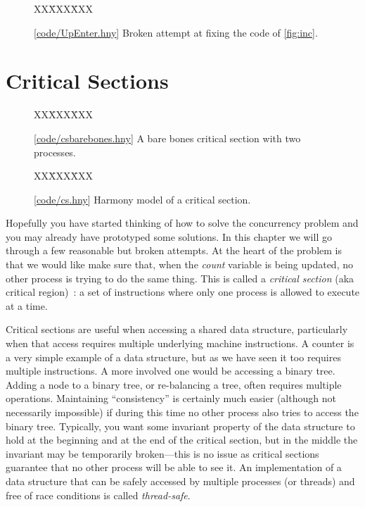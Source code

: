 \documentclass{report}
\newcommand{\harmonysource}[1]{
\begin{tabbing}
XX\=XXX\=XXX\kill
    
\end{tabbing}
}
\newcommand{\harmonylink}[1]{%
[\href{https://www.cs.cornell.edu/home/rvr/harmony/#1}{\underline{#1}}]%
}
\newenvironment{code}{
\tcolorbox
}{
\endtcolorbox
}
\begin{document}
\begin{figure}
\begin{code}
\harmonysource{UpEnter}
\end{code}
\caption{\harmonylink{code/UpEnter.hny} Broken attempt at fixing the code of \autoref{fig:inc}.}
\label{fig:incenter}
\end{figure}

\chapter{Critical Sections}
\label{ch:critical}

\begin{figure}
\begin{code}
\harmonysource{csbarebones}
\end{code}
\caption{\harmonylink{code/csbarebones.hny} A bare bones critical section with two processes.}
\label{fig:csbarebones}
\end{figure}

\begin{figure}
\begin{code}
\harmonysource{cs}
\end{code}
\caption{\harmonylink{code/cs.hny} Harmony model of a critical section.}
\label{fig:cs}
\end{figure}

Hopefully you have started thinking of how to solve the concurrency
problem and you may already have prototyped some solutions.
In this chapter we will go through a few reasonable but broken attempts.
At the heart of the problem is that we would like make sure that, when
the \textit{count} variable is being updated, no other process is
trying to do the same thing.  This is called a \emph{critical section}
(aka critical region)~\cite{EWD123}:
a set of instructions where only one process is allowed to execute at a
time.
%
%

%
%

Critical sections are useful when accessing a shared data
structure, particularly when that access requires multiple underlying
machine instructions.  A counter is a very simple example of
a data structure, but as we have seen it too requires multiple instructions.
A more involved one would be accessing a binary tree.
Adding a node to a binary tree, or re-balancing a tree, often requires
multiple operations.  Maintaining ``consistency'' is certainly much easier
(although not necessarily impossible) if during this time no other
process also tries to access the binary tree.
Typically, you want some invariant property of the data structure to hold
at the beginning and at the end of the critical section, but in the middle
the invariant may be temporarily broken---this is no issue as critical
sections guarantee that no other
process will be able to see it.
An implementation of a data structure that can be safely accessed by multiple
processes (or threads) and free of race conditions is called \emph{thread-safe}.
%
%
\end{document}
